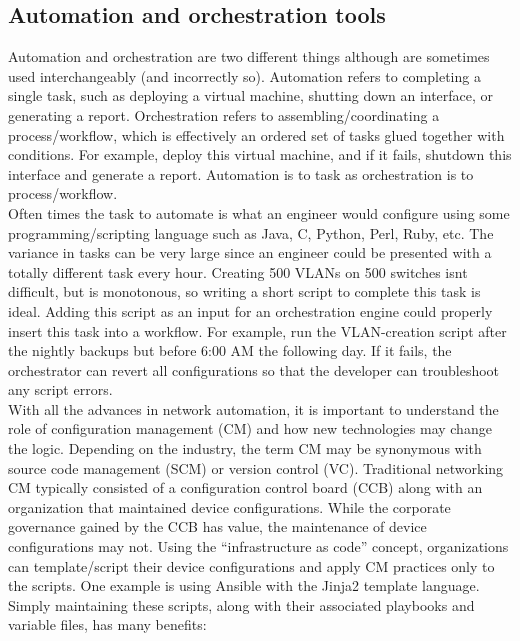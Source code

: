 \subsection{Automation and orchestration tools}
Automation and orchestration are two different things although are sometimes
used interchangeably (and incorrectly so). Automation refers to completing a
single task, such as deploying a virtual machine, shutting down an interface,
or generating a report. Orchestration refers to assembling/coordinating a
process/workflow, which is effectively an ordered set of tasks glued together
with conditions. For example, deploy this virtual machine, and if it fails,
shutdown this interface and generate a report. Automation is to task as
orchestration is to process/workflow. \\

Often times the task to automate is what an engineer would configure using
some programming/scripting language such as Java, C, Python, Perl, Ruby, etc.
The variance in tasks can be very large since an engineer could be presented
with a totally different task every hour. Creating 500 VLANs on 500 switches
isnt difficult, but is monotonous, so writing a short script to complete this
task is ideal. Adding this script as an input for an orchestration engine
could properly insert this task into a workflow. For example, run the
VLAN-creation script after the nightly backups but before 6:00 AM the
following day. If it fails, the orchestrator can revert all configurations so
that the developer can troubleshoot any script errors. \\

With all the advances in network automation, it is important to understand the
role of configuration management (CM) and how new technologies may change the
logic. Depending on the industry, the term CM may be synonymous with source
code management (SCM) or version control (VC). Traditional networking CM
typically consisted of a configuration control board (CCB) along with an
organization that maintained device configurations. While the corporate
governance gained by the CCB has value, the maintenance of device
configurations may not. Using the ``infrastructure as code'' concept,
organizations can template/script their device configurations and apply CM
practices only to the scripts. One example is using Ansible with the Jinja2
template language. Simply maintaining these scripts, along with their
associated playbooks and variable files, has many benefits:


